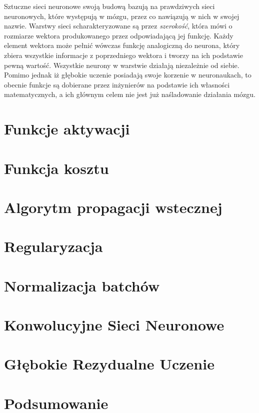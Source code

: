 \documentclass[licencjacka]{pracamgr}
\begin{document}
Sztuczne sieci neuronowe swoją budową bazują na prawdziwych sieci neuronowych, które występują w mózgu, przez co nawiązują w nich w swojej nazwie. Warstwy sieci scharakteryzowane są przez \emph{szerokość}, która mówi o rozmiarze wektora produkowanego przez odpowiadającą jej funkcję. Każdy element wektora może pełnić wówczas funkcję analogiczną do neurona, który zbiera wszystkie informacje z poprzedniego wektora i tworzy na ich podstawie pewną wartość. Wszystkie neurony w warstwie działają niezależnie od siebie. Pomimo jednak iż głębokie uczenie posiadają swoje korzenie w neuronaukach, to obecnie funkcje są dobierane przez inżynierów na podstawie ich własności matematycznych, a ich głównym celem nie jest już naśladowanie działania mózgu.

\section{Funkcje aktywacji}

\section{Funkcja kosztu}

\section{Algorytm propagacji wstecznej}

\section{Regularyzacja}

\section{Normalizacja batchów}

\section{Konwolucyjne Sieci Neuronowe}

\section{Głębokie Rezydualne Uczenie}

\section{Podsumowanie}
\end{document}
